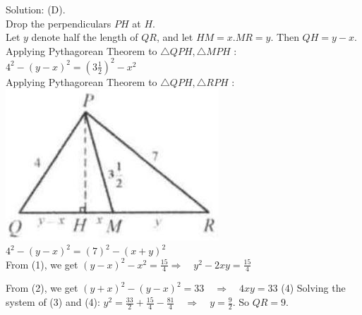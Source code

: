 \documentclass{article}
\begin{document}
Solution: (D).\\
Drop the perpendiculars \(P H\) at \(H\).\\
Let \(y\) denote half the length of \(Q R\), and let \(H M=x . M R=y\). Then \(Q H=y-x\).\\
Applying Pythagorean Theorem to \(\triangle Q P H, \triangle M P H\) :\\
\(4^{2}-(y-x)^{2}=\left(3 \frac{1}{2}\right)^{2}-x^{2}\)\\
Applying Pythagorean Theorem to \(\triangle Q P H, \triangle R P H\) :\\
\centering
\includegraphics[width=\textwidth]{images/reasoning_image_1.jpg}\\
\(4^{2}-(y-x)^{2}=(7)^{2}-(x+y)^{2}\)\\
From (1), we get \((y-x)^{2}-x^{2}=\frac{15}{4} \Rightarrow \quad y^{2}-2 x y=\frac{15}{4}\)


From (2), we get \((y+x)^{2}-(y-x)^{2}=33 \quad \Rightarrow \quad 4 x y=33\) (4) Solving the system of (3) and (4): \(y^{2}=\frac{33}{2}+\frac{15}{4}-\frac{81}{4} \quad \Rightarrow \quad y=\frac{9}{2}\). So \(Q R=9\).
\end{document}
